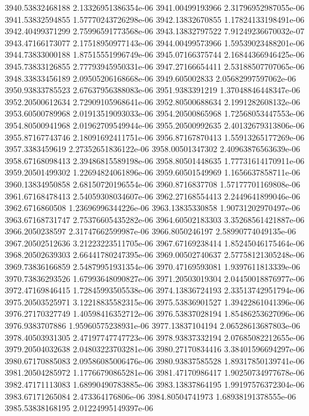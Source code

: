 {3940.53832468188 2.13326951386354e-06
3941.00499193966 2.31796952987055e-06
3941.53832594855 1.57770243726298e-06
3942.13832670855 1.17824133198491e-06
3942.40499371299 2.75996591773568e-06
3943.13832797522 7.91249236670032e-07
3943.47166173077 2.17518950977143e-06
3944.00499573966 1.59539023488201e-06
3944.73833000188 1.87515551996749e-06
3945.07166375744 2.16844366946425e-06
3945.73833126855 2.77793945950331e-06
3947.27166654411 2.53188507707065e-06
3948.33833456189 2.09505206168668e-06
3949.605002833 2.05682997597062e-06
3950.93833785523 2.67637956388083e-06
3951.9383391219 1.37048846448347e-06
3952.20500612634 2.72909105968641e-06
3952.80500688634 2.1991282608132e-06
3953.60500789968 2.01913519093033e-06
3954.20500865968 1.72568053447553e-06
3954.80500941968 2.01962709549944e-06
3955.20500992635 2.40132679313806e-06
3955.87167743746 2.18091692411751e-06
3956.87167870413 1.55913265177269e-06
3957.3383459619 2.27352651836122e-06
3958.00501347302 2.40963876563639e-06
3958.67168098413 2.39486815589198e-06
3958.80501448635 1.77731614170911e-06
3959.20501499302 1.22694824061896e-06
3959.60501549969 1.1656637858711e-06
3960.13834950858 2.68150720196554e-06
3960.8716837708 1.57177701169808e-06
3961.67168478413 2.54059308034607e-06
3962.27168554413 2.2449641899046e-06
3962.6716860508 1.23696996344226e-06
3963.13835330858 1.90731202970497e-06
3963.67168731747 2.75376605435282e-06
3964.60502183303 3.35268561421887e-06
3966.2050238597 2.31747662599987e-06
3966.8050246197 2.58990774049135e-06
3967.20502512636 3.21223223511705e-06
3967.67169238414 1.85245046175464e-06
3968.20502639303 2.66441780247395e-06
3969.00502740637 2.57758121305248e-06
3969.73836166859 2.54879951931354e-06
3970.47169593081 1.9397611813339e-06
3970.73836293526 1.67993648090827e-06
3971.20503019304 2.04450018876977e-06
3972.47169846415 1.72845993505538e-06
3974.13836724193 2.33513742951794e-06
3975.20503525971 3.12218835582315e-06
3975.53836901527 1.39422861041396e-06
3976.27170327749 1.40598416352712e-06
3976.53837028194 1.85486253627096e-06
3976.9383707886 1.95960575238931e-06
3977.13837104194 2.06528613687803e-06
3978.40503931305 2.47197747747723e-06
3978.93837332194 2.07685082212655e-06
3979.20504032638 2.04803223703281e-06
3980.27170834416 3.38401596694297e-06
3980.67170885083 2.09586085006476e-06
3980.93837585528 1.89317850139741e-06
3981.20504285972 1.17766790865281e-06
3981.47170986417 1.90250734977678e-06
3982.47171113083 1.68990490783885e-06
3983.13837864195 1.99197576372304e-06
3983.67171265084 2.473364176806e-06
3984.80504741973 1.68938191378555e-06
3985.53838168195 2.01224995149397e-06
}
